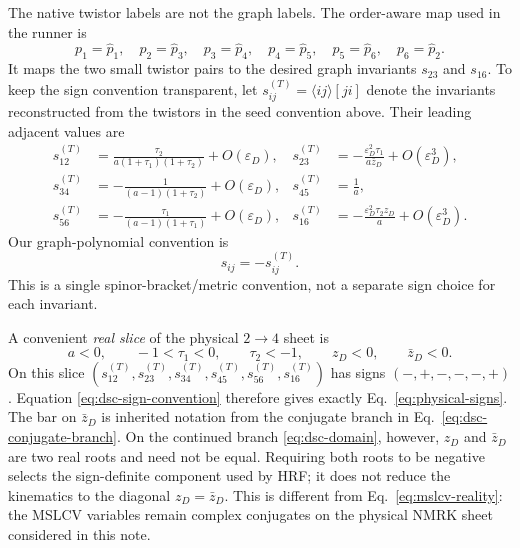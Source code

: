 \documentclass[11pt]{article}
\begin{document}
The native twistor labels are not the graph labels.  The order-aware map used
in the runner is
\begin{equation}
 p_1=\hat p_1,\quad p_2=\hat p_3,\quad p_3=\hat p_4,\quad
 p_4=\hat p_5,\quad p_5=\hat p_6,\quad p_6=\hat p_2.
 \label{eq:dsc-label-map}
\end{equation}
It maps the two small twistor pairs to the desired graph invariants
\(s_{23}\) and \(s_{16}\).  To keep the sign convention transparent, let
\(s_{ij}^{(T)}=\langle ij\rangle[ji]\) denote the invariants reconstructed
from the twistors in the seed convention above.  Their leading adjacent
values are
\begin{equation}
\begin{aligned}
s_{12}^{(T)}&=\frac{\tau_2}{a(1+\tau_1)(1+\tau_2)}+O(\varepsilon_D),&
s_{23}^{(T)}&=-\frac{\varepsilon_D^2\tau_1}{a\bar z_D}+O(\varepsilon_D^3),\\
s_{34}^{(T)}&=-\frac{1}{(a-1)(1+\tau_2)}+O(\varepsilon_D),&
s_{45}^{(T)}&=\frac1a,\\
s_{56}^{(T)}&=-\frac{\tau_1}{(a-1)(1+\tau_1)}+O(\varepsilon_D),&
s_{16}^{(T)}&=-\frac{\varepsilon_D^2\tau_2z_D}{a}+O(\varepsilon_D^3).
\end{aligned}
\label{eq:dsc-runner-leading-adjacent}
\end{equation}
Our graph-polynomial convention is
\begin{equation}
 s_{ij}=-s_{ij}^{(T)}.
 \label{eq:dsc-sign-convention}
\end{equation}
This is a single spinor-bracket/metric convention, not a separate sign choice
for each invariant.

A convenient \emph{real slice} of the physical \(2\to4\) sheet is
\begin{equation}
 a<0,\qquad -1<\tau_1<0,\qquad \tau_2<-1,\qquad
 z_D<0,\qquad \bar z_D<0.
 \label{eq:dsc-domain}
\end{equation}
On this slice \((s_{12}^{(T)},s_{23}^{(T)},s_{34}^{(T)},s_{45}^{(T)},
s_{56}^{(T)},s_{16}^{(T)})\) has signs
\((- ,+,-,-,-,+)\).  Equation \eqref{eq:dsc-sign-convention} therefore gives
exactly Eq.~\eqref{eq:physical-signs}.  The bar on \(\bar z_D\) is inherited
notation from the conjugate branch in Eq.~\eqref{eq:dsc-conjugate-branch}.
On the continued branch \eqref{eq:dsc-domain}, however, \(z_D\) and
\(\bar z_D\) are two real roots and need not be equal.  Requiring both roots
to be negative selects the sign-definite component used by HRF; it does not
reduce the kinematics to the diagonal \(z_D=\bar z_D\).  This is different
from Eq.~\eqref{eq:mslcv-reality}: the MSLCV variables remain complex
conjugates on the physical NMRK sheet considered in this note.
\end{document}
